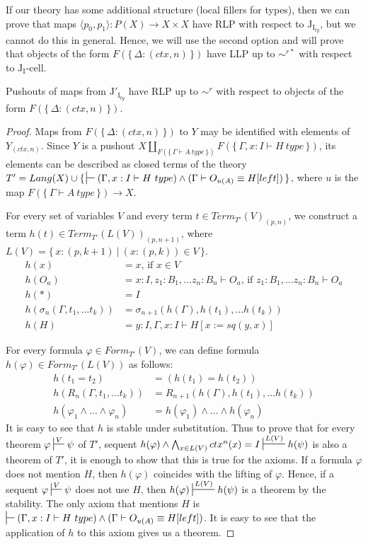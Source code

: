 \documentclass{mscs}
\newcommand{\deq}{\equiv}
\newcommand{\repl}{:=}
\newcommand{\emptyCtx}{*}
\newcommand{\I}{\mathrm{I}}
\newcommand{\J}{\mathrm{J}}
\newcommand{\class}[2]{#1\text{-}\mathrm{#2}}
\newcommand{\Icell}[1][\I]{\class{#1}{cell}}
\newcommand{\Jcell}[1][]{\Icell[\J#1]}
\numberwithin{figure}{section}
\begin{document}
If our theory has some additional structure (local fillers for types),
then we can prove that maps $\langle p_0, p_1 \rangle : P(X) \to X \times X$ have RLP with respect to $\J_{\I_{ty}}$, but we cannot do this in general.
Hence, we will use the second option and will prove that objects of the form $F(\{\,\Delta : (ctx,n)\,\})$ have LLP up to $\sim^{r*}$ with respect to $\Jcell[_\I]$.

\begin{lem}[Jty]
Pushouts of maps from $\J'_{\I_{ty}}$ have RLP up to $\sim^r$ with respect to objects of the form $F(\{\,\Delta : (ctx,n)\,\})$.
\end{lem}
\begin{proof}
Maps from $F(\{\,\Delta : (ctx,n)\,\})$ to $Y$ may be identified with elements of $Y_{(ctx,n)}$.
Since $Y$ is a pushout $X \amalg_{F(\{\,\Gamma \vdash A\ type\,\})} F(\{\,\Gamma, x : I \vdash H\ type\,\})$,
its elements can be described as closed terms of the theory
$T' = Lang(X) \cup \{\,\sststile{}{} (\Gamma, x : I \vdash H\ type) \land (\Gamma \vdash O_{u(A)} \deq H[left])\,\}$,
where $u$ is the map $F(\{\,\Gamma \vdash A\ type\,\}) \to X$.

For every set of variables $V$ and every term $t \in Term_{T'}(V)_{(p,n)}$,
we construct a term $h(t) \in Term_{T'}(L(V))_{(p,n+1)}$, where $L(V) = \{\,x : (p,k+1)\ |\ (x : (p,k)) \in V\,\}$.
\begin{align*}
h(x) & = x \text{, if } x \in V \\
h(O_a) & = x : I, z_1 : B_1, \ldots z_n : B_n \vdash O_a \text{, if } z_1 : B_1, \ldots z_n : B_n \vdash O_a \\
h(\emptyCtx) & = I \\
h(\sigma_n(\Gamma, t_1, \ldots t_k)) & = \sigma_{n+1}(h(\Gamma), h(t_1), \ldots h(t_k)) \\
h(H) & = y : I, \Gamma, x : I \vdash H[x \repl sq(y, x)]
\end{align*}

For every formula $\varphi \in Form_{T'}(V)$, we can define formula $h(\varphi) \in Form_{T'}(L(V))$ as follows:
\begin{align*}
h(t_1 = t_2) & = (h(t_1) = h(t_2)) \\
h(R_n(\Gamma, t_1, \ldots t_k)) & = R_{n+1}(h(\Gamma), h(t_1), \ldots h(t_k)) \\
h(\varphi_1 \land \ldots \land \varphi_n) & = h(\varphi_1) \land \ldots \land h(\varphi_n)
\end{align*}
It is easy to see that $h$ is stable under substitution.
Thus to prove that for every theorem $\varphi \sststile{}{V} \psi$ of $T'$, sequent $h(\varphi) \land \bigwedge_{x \in L(V)} ctx^n(x) = I \sststile{}{L(V)} h(\psi)$
is also a theorem of $T'$, it is enough to show that this is true for the axioms.
If a formula $\varphi$ does not mention $H$, then $h(\varphi)$ coincides with the lifting of $\varphi$.
Hence, if a sequent $\varphi \sststile{}{V} \psi$ does not use $H$, then $h(\varphi) \sststile{}{L(V)} h(\psi)$ is a theorem by the stability.
The only axiom that mentions $H$ is $\sststile{}{} (\Gamma, x : I \vdash H\ type) \land (\Gamma \vdash O_{u(A)} \deq H[left])$.
It is easy to see that the application of $h$ to this axiom gives us a theorem.


\end{proof}
\end{document}
